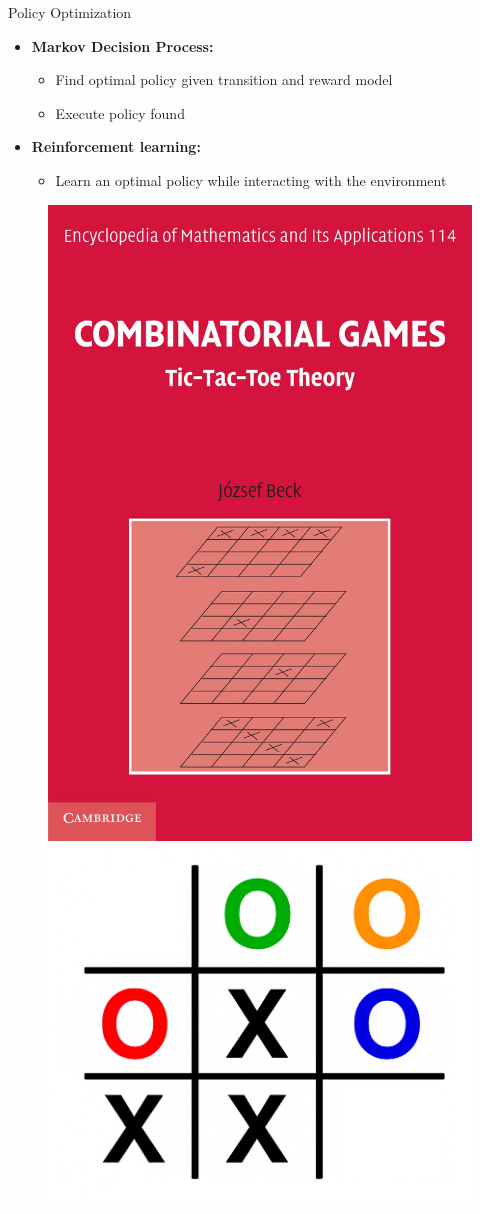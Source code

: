\documentclass[11pt,table]{beamer}
\begin{document}
\begin{frame}{Policy Optimization}


\begin{itemize}
    \item \textbf{Markov Decision Process:}
    \begin{itemize}
\item Find optimal policy given transition and reward model
\item Execute policy found\\[2ex]
\end{itemize}

\item \textbf{Reinforcement learning:}
\begin{itemize}
\item Learn an optimal policy while interacting with the  environment
\end{itemize}
\end{itemize}

\begin{figure}
	\centering
\pause		\includegraphics[width=.25\textwidth]{figures/Beck}
\pause		\includegraphics[width=.3\textwidth]{figures/play.png}
\end{figure}
    
\end{frame}
\end{document}
